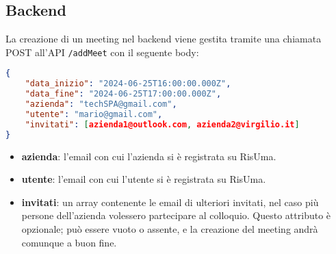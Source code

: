 \subsection{Backend}
La creazione di un meeting nel backend viene gestita tramite una chiamata POST all'API \texttt{\//addMeet} con il seguente body:
\begin{lstlisting}[language=json,firstnumber=1]
{
    "data_inizio": "2024-06-25T16:00:00.000Z", 
    "data_fine": "2024-06-25T17:00:00.000Z",   
    "azienda": "techSPA@gmail.com", 
    "utente": "mario@gmail.com",
    "invitati": [azienda1@outlook.com, azienda2@virgilio.it]
}
\end{lstlisting}
\begin{itemize}
    \item \textbf{azienda}: l'email con cui l'azienda si è registrata su RisUma.
    \item \textbf{utente}: l'email con cui l'utente si è registrata su RisUma.
    \item \textbf{invitati}: un array contenente le email di ulteriori invitati, nel caso più persone dell'azienda volessero 
    partecipare al colloquio. Questo attributo è opzionale; può essere vuoto o assente, e la creazione del meeting andrà comunque a buon fine.
\end{itemize}


